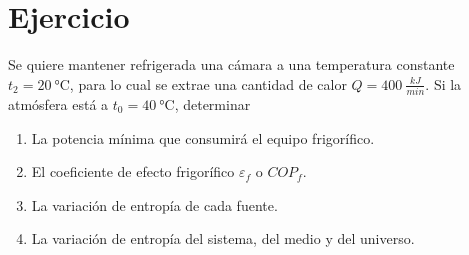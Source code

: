 \section{Ejercicio}\label{ej:Chap07Ejercicio20}
Se quiere mantener refrigerada una cámara a una temperatura constante $t_2=\SI{20}{\celsius}$, para lo cual se extrae una cantidad de calor $Q=\SI{400}{\frac{kJ}{min}}$. Si la atmósfera está a $t_0=\SI{40}{\celsius}$, determinar
\begin{enumerate}
    \item La potencia mínima que consumirá el equipo frigorífico.
    \item El coeficiente de efecto frigorífico $\varepsilon_f$ o $COP_f$.
    \item La variación de entropía de cada fuente.
    \item La variación de entropía del sistema, del medio y del universo.
\end{enumerate}